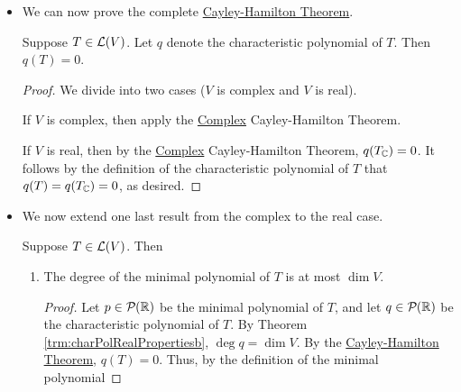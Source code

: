 \documentclass[../main.tex]{subfiles}
\begin{document}
\begin{itemize}
\begin{theorem}
\begin{enumerate}[label={\textup{(}\alph*\textup{)}},ref={\thetheorem\alph*}]
            \begin{proof}
                See Theorem \ref{trm:charPolPropertiesa}.
            \end{proof}
            \item \label{trm:charPolRealPropertiesc}The eigenvalues of $T$ are precisely the real zeroes of the characteristic polynomial of $T$.
            \begin{proof}
                By Theorem \ref{trm:minPolyTcT}, the real zeroes of the characteristic polynomial of $T$ are the real zeroes of the characteristic polynomial of $T_\C$. These are, in turn, the real eigenvalues of $T_\C$ (by Theorem \ref{trm:charPolPropertiesb}). These, lastly, are in turn the eigenvalues of $T$ (by Theorem \ref{trm:realEigenvalueComplexification}).
            \end{proof}
        \end{enumerate}
    \end{theorem}
    \item We can now prove the complete \hyperref[trm:CayleyHamilton]{Cayley-Hamilton Theorem}.
    \begin{theorem}\label{trm:CayleyHamilton}
        Suppose $T\in\mathcal{L}(V)$. Let $q$ denote the characteristic polynomial of $T$. Then $q(T)=0$.
        \begin{proof}
            We divide into two cases ($V$ is complex and $V$ is real).\par
            If $V$ is complex, then apply the \hyperref[trm:ComplexCayleyHamilton]{Complex} Cayley-Hamilton Theorem.\par
            If $V$ is real, then by the \hyperref[trm:ComplexCayleyHamilton]{Complex} Cayley-Hamilton Theorem, $q(T_{\mathbb{C}})=0$. It follows by the definition of the characteristic polynomial of $T$ that $q(T)=q(T_{\mathbb{C}})=0$, as desired.
        \end{proof}
    \end{theorem}
    \item We now extend one last result from the complex to the real case.
    \begin{theorem}
        Suppose $T\in\mathcal{L}(V)$. Then
        \begin{enumerate}[label={\textup{(}\alph*\textup{)}}]
            \item The degree of the minimal polynomial of $T$ is at most $\dim V$.
            \begin{proof}
                Let $p\in\mathcal{P}_{}(\mathbb{R})$ be the minimal polynomial of $T$, and let $q\in\mathcal{P}_{}(\mathbb{R})$ be the characteristic polynomial of $T$. By Theorem \ref{trm:charPolRealPropertiesb}, $\deg q=\dim V$. By the \hyperref[trm:CayleyHamilton]{Cayley-Hamilton Theorem}, $q(T)=0$. Thus, by the definition of the minimal polynomial

\end{proof}
\end{enumerate}
\end{theorem}
\end{itemize}
\end{document}
